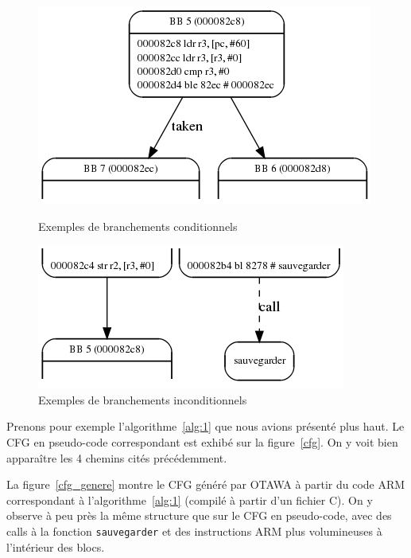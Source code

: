 \documentclass[french]{article}
\begin{document}
  \begin{figure}
    \begin{minipage}[c]{.46\linewidth}
      \includegraphics[scale=0.5]{./pictures/conditional_branch.png}
      \caption{Exemples de branchements conditionnels}
      \label{branchement conditionnel}
   \end{minipage} \hfill
   \begin{minipage}[c]{.46\linewidth}
      \includegraphics[scale=0.5]{./pictures/incoditional_branch.png}
      \caption{Exemples de branchements inconditionnels}
      \label{branchement inconditionnel}
   \end{minipage}
\end{figure}

  \bigbreak

  Prenons pour exemple l'algorithme~\ref{alg:1} que nous avions présenté plus haut. Le CFG en pseudo-code correspondant est exhibé sur la figure~\ref{cfg}. On y voit bien apparaître les 4 chemins cités précédemment. %

  La figure~\ref{cfg_genere} montre le CFG généré par OTAWA à partir du code ARM correspondant à l'algorithme~\ref{alg:1} (compilé à partir d'un fichier C). On y observe à peu près la même structure que sur le CFG en pseudo-code, avec des calls à la fonction \texttt{sauvegarder} et des instructions ARM plus volumineuses à l'intérieur des blocs.
\end{document}
